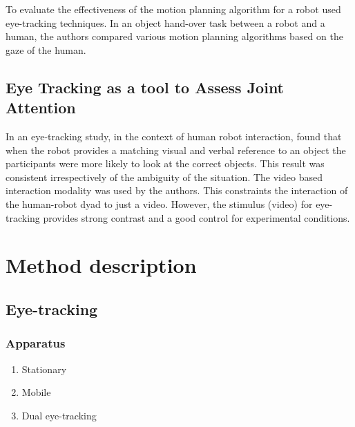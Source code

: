 \documentclass{sig-alternate}
\begin{document}
To evaluate the effectiveness of the motion planning algorithm for a robot \cite{dehais2011physiological} used eye-tracking techniques. In an object hand-over task between a robot and a human, the authors compared various motion planning algorithms based on the gaze of the human.

\subsection{Eye Tracking as a tool to Assess Joint Attention}

 In an eye-tracking study, in the context of human robot interaction, \cite{staudte2009visual} found
that when the robot provides a matching visual and verbal reference to an object
the participants were more likely to look at the correct objects. This result
was consistent irrespectively of the ambiguity of the situation. The video based interaction modality was used by the authors. This constraints the  interaction of the human-robot dyad to just a video. However, the stimulus (video) for eye-tracking provides strong contrast and a good control for experimental conditions.







\section{Method description}
\label{method}

\subsection{Eye-tracking}


\subsubsection{Apparatus}


\begin{enumerate}
\item Stationary
\item Mobile 
\item Dual eye-tracking

\end {enumerate}
\end{document}
